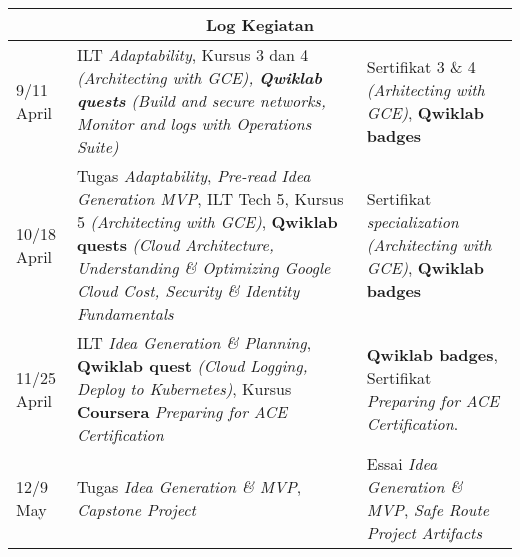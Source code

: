 \begin{tabular}{ |p{3cm}|p{6cm}|p{3cm}|  }
 \hline
 \multicolumn{3}{|c|}{Log Kegiatan} \\
 \hline
 9/11 April & ILT \textit{Adaptability}, Kursus 3 dan 4 \textit{(Architecting with GCE), \textbf{Qwiklab quests} \textit{(Build and secure networks, Monitor and logs with Operations Suite)}} & Sertifikat 3 \& 4 \textit{(Arhitecting with GCE)}, \textbf{Qwiklab badges} \\
 \hline
 10/18 April & Tugas \textit{Adaptability}, \textit{Pre-read Idea Generation \7 MVP}, ILT Tech 5, Kursus 5 \textit{(Architecting with GCE)}, \textbf{Qwiklab quests} \textit{(Cloud Architecture, Understanding \& Optimizing Google Cloud Cost, Security \& Identity Fundamentals} & Sertifikat \textit{specialization (Architecting with GCE)}, \textbf{Qwiklab badges} \\
 \hline
 11/25 April & ILT \textit{Idea Generation \& Planning}, \textbf{Qwiklab quest} \textit{(Cloud Logging, Deploy to Kubernetes)}, Kursus \textbf{Coursera} \textit{Preparing for ACE Certification} & \textbf{Qwiklab badges}, Sertifikat \textit{Preparing for ACE Certification}. \\
 \hline
 12/9 May & Tugas \textit{Idea Generation \& MVP}, \textit{Capstone Project} & Essai \textit{Idea Generation \& MVP}, \textit{Safe Route Project Artifacts} \\
 \hline
\end{tabular}